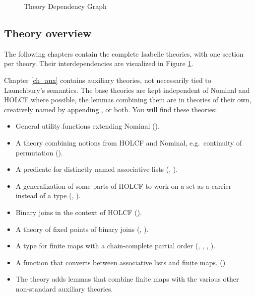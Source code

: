 \documentclass[11pt,a4paper,parskip=half]{scrartcl}
\begin{document}
\begin{figure}
\begin{center}
\end{center}
\caption{Theory Dependency Graph\label{theory-deps}}
\end{figure}

\subsection{Theory overview}

The following chapters contain the complete Isabelle theories, with one section per theory. Their interdependencies are visualized in Figure \ref{theory-deps}.

Chapter \ref{ch_aux} contains auxiliary theories, not necessarily tied to Launchbury's semantics. The base theories are kept independent of Nominal and HOLCF where possible, the lemmas combining them are in theories of their own, creatively named by appending ,  or both.  You will find these theories:
\begin{itemize}
\item General utility functions extending Nominal ().
\item A theory combining notions from HOLCF and Nominal, e.g.\ continuity of permutation ().
\item A predicate for distinctly named associative lists (, ). 
\item A generalization of some parts of HOLCF to work on a set as a carrier instead of a type (, ).
\item Binary joins in the context of HOLCF ().
\item A theory of fixed points of binary joins (, ).
\item A type for finite maps with a chain-complete partial order (, , , ).
\item A function  that converts between associative lists and finite maps. ()
\item The theory  adds lemmas that combine finite maps with the various other non-standard auxiliary theories.
\end{itemize}
\end{document}
